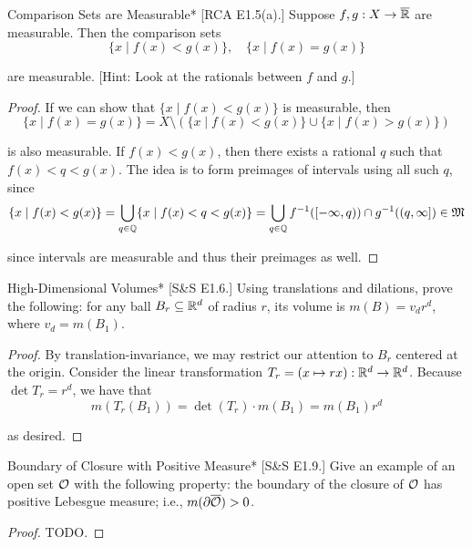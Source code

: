 \begin{problem}{Comparison Sets are Measurable}*
    [RCA E1.5(a).] Suppose \(f,g : X \to \overline{\mathbb{R}}\) are measurable. Then the comparison sets 
    \[
        \{x \mid f(x) < g(x)\}, \quad \{x \mid f(x) = g(x)\}
    \]

    are measurable. [Hint: Look at the rationals between \(f\) and \(g\).]
\end{problem}

\begin{proof}
    If we can show that \(\{x \mid f(x) < g(x)\}\) is measurable, then 
    \[
        \{x \mid f(x) = g(x)\} = X \setminus (\{x \mid f(x) < g(x)\} \cup \{x \mid f(x) > g(x)\})
    \] 

    is also measurable. If \(f(x) < g(x)\), then there exists a rational \(q\) such that \(f(x) < q < g(x)\). The idea is to form preimages of intervals using all such \(q\), since 
    \[
    \{x \mid f(x) < g(x) \}
    = \bigcup_{q \in \mathbb{Q}} \{x \mid f(x) < q < g(x)\}
    = \bigcup_{q \in \mathbb{Q}} f^{-1}([-\infty, q)) \cap g^{-1}((q, \infty])
    \in \mathfrak{M}
    \]

    since intervals are measurable and thus their preimages as well. 
\end{proof}

\begin{problem}{High-Dimensional Volumes}*
    [S\&S E1.6.] Using translations and dilations, prove the following: for any ball \(B_r \subseteq \mathbb{R}^d\) of radius \(r\), its volume is \(m(B) = v_d r^d\), where \(v_d = m(B_1)\). 
\end{problem}

\begin{proof}
    By translation-invariance, we may restrict our attention to \(B_r\) centered at the origin. Consider the linear transformation \(T_r = (x\mapsto rx) : \mathbb{R}^d \to \mathbb{R}^d\). Because \(\det T_r = r^d\), we have that 
    \[
        m(T_r(B_1)) = \det(T_r) \cdot m(B_1) = m(B_1) r^d
    \]

    as desired. 
\end{proof}

\begin{problem}{Boundary of Closure with Positive Measure}*
    [S\&S E1.9.] Give an example of an open set \(\mathcal{O}\) with the following property: the boundary of the closure of \(\mathcal{O}\) has positive Lebesgue measure; i.e., \(m(\partial \overline{\mathcal{O}}) > 0\). 
\end{problem}

\begin{proof}
    TODO. 
\end{proof}

